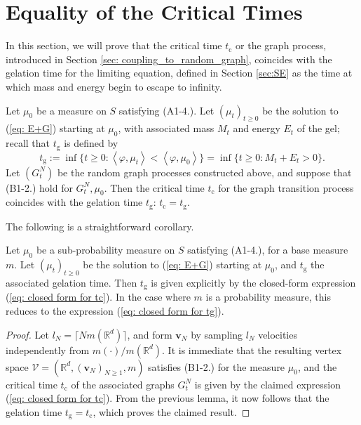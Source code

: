 \section{Equality of the Critical Times} \label{sec: ECT}

In this section, we will prove that the critical time $t_\mathrm{c}$ or the graph process, introduced in Section \ref{sec: coupling_to_random_graph}, coincides with the gelation time for the limiting equation, defined in Section \ref{sec:SE} as the time at which mass and energy begin to escape to infinity. 
\begin{lemma}\label{lemma: connect critical times} Let $\mu_0$ be a measure on $S$ satisfying ({A1-4}.). Let $(\mu_t)_{t\ge 0}$ be the solution to (\ref{eq: E+G}) starting at $\mu_0$, with associated mass $M_t$ and energy $E_t$ of the gel; recall that $t_\mathrm{g}$ is defined by \begin{equation}
    t_\mathrm{g}:=\inf\{t\ge 0: \left<\varphi, \mu_t\right> < \left<\varphi, \mu_0\right>\} 
    = \inf\{t\ge 0: M_t+E_t>0\}.
\end{equation} Let $(G^N_t)$ be the random graph processes constructed above, and suppose that (B1-2.) hold for $G^N_t, \mu_0$. Then the critical time $t_\mathrm{c}$ for the graph transition process coincides with the gelation time $t_\mathrm{g}$: $ t_\mathrm{c}=t_\mathrm{g}. $ \end{lemma} The following is a straightforward corollary. \begin{corollary}\label{corr: actual expression for tg} Let $\mu_0$ be a sub-probability measure on $S$ satisfying (A1-4.), for a base measure $m$. Let $(\mu_t)_{t\ge 0}$ be the solution to (\ref{eq: E+G}) starting at $\mu_0$, and $t_\mathrm{g}$ the associated gelation time. Then $t_\mathrm{g}$ is given explicitly by the closed-form expression (\ref{eq: closed form for tc}). In the case where $m$ is a probability measure, this reduces to the expression (\ref{eq: closed form for tg}).   \end{corollary} \begin{proof} Let $l_N=\lceil N m(\mathbb{R}^d)\rceil$, and form $\mathbf{v}_N$ by sampling $l_N$ velocities independently from $m(\cdot)/m(\mathbb{R}^d).$ It is immediate that the resulting vertex space $\mathcal{V}=(\mathbb{R}^d, (\mathbf{v}_N)_{N\ge 1}, m)$ satisfies (B1-2.) for the measure $\mu_0$, and the critical time $t_\mathrm{c}$ of the associated graphs $G^N_t$ is given by the claimed expression (\ref{eq: closed form for tc}). From the previous lemma, it now follows that the gelation time $t_\mathrm{g}=t_\mathrm{c}$, which proves the claimed result. \end{proof} 
